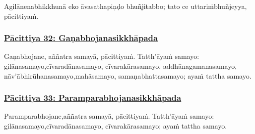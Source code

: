 Agilānena\makeatletter\hyperlink{endnote280-appendix}\makeatother \thinspace bhikkhunā eko āvasathapiṇḍo bhuñjitabbo; tato ce uttariṁ\makeatletter\hyperlink{endnote281-appendix}\makeatother \thinspace bhuñjeyya, pācittiyaṁ.



\subsubsection*{\hyperref[exp32]{Pācittiya 32: Gaṇabhojanasikkhāpada}}
\label{pac32}

Gaṇabhojane, aññatra samayā, pācittiyaṁ. Tatth'āyaṁ samayo: gilānasamayo,\makeatletter\hyperlink{endnote282-appendix}\makeatother \thinspace cīvaradānasamayo, cīvarakārasamayo, addhānagamanasamayo, nāv'ābhirūhanasamayo,\makeatletter\hyperlink{endnote283-appendix}\makeatother \thinspace mahāsamayo, samaṇabhattasamayo; ayaṁ tattha samayo.



\subsubsection*{\hyperref[exp33]{Pācittiya 33: Paramparabhojanasikkhāpada}}
\label{pac33}

Paramparabhojane,\makeatletter\hyperlink{endnote284-appendix}\makeatother \thinspace aññatra samayā, pācittiyaṁ. Tatth'āyaṁ samayo: gilānasamayo,\makeatletter\hyperlink{endnote285-appendix}\makeatother \thinspace cīvaradānasamayo, cīvarakārasamayo; ayaṁ tattha samayo.



